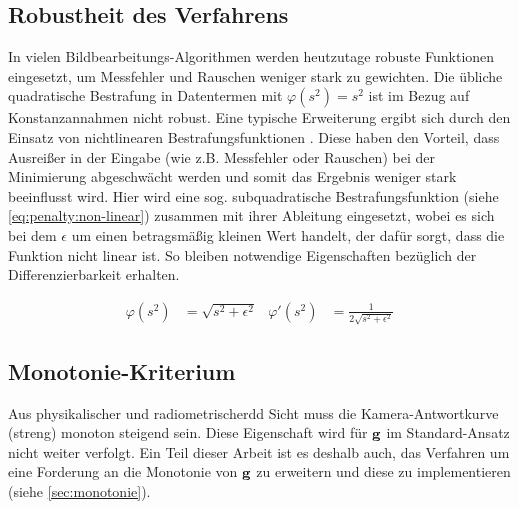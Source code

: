 \subsection{Robustheit des Verfahrens}
\label{algo:schwachstellen:robustheit}
In vielen Bildbearbeitungs-Algorithmen werden heutzutage robuste Funktionen eingesetzt, um Messfehler und Rauschen weniger stark zu gewichten. Die übliche quadratische Bestrafung in Datentermen mit $\varphi(s^2) = s^2$ ist im Bezug auf Konstanzannahmen nicht robust. Eine typische Erweiterung ergibt sich durch den Einsatz von nichtlinearen Bestrafungsfunktionen \cite[S. 9f, S. 87f]{bruhn06}. Diese haben den Vorteil, dass Ausreißer in der Eingabe (wie z.B. Messfehler oder Rauschen) bei der Minimierung abgeschwächt werden und somit das Ergebnis weniger stark beeinflusst wird. Hier wird eine sog. subquadratische Bestrafungsfunktion (siehe \autoref{eq:penalty:non-linear}) zusammen mit ihrer Ableitung eingesetzt, wobei es sich bei dem $\epsilon$ um einen betragsmäßig kleinen Wert handelt, der dafür sorgt, dass die Funktion nicht linear ist. So bleiben notwendige Eigenschaften bezüglich der Differenzierbarkeit erhalten.

\begin{align}
\label{eq:penalty:non-linear}
\varphi(s^2) &= \sqrt{s^2 + \epsilon^2} & 
\varphi'(s^2) &= \frac{1}{2\sqrt{s^2 + \epsilon^2}}
\end{align}

\subsection{Monotonie-Kriterium}
\label{algo:schwachstellen:monotonie}
Aus physikalischer und radiometrischerdd Sicht muss die Kamera-Antwortkurve (streng) monoton steigend sein. Diese Eigenschaft wird für $\mathbf g$ im Standard-Ansatz nicht weiter verfolgt. Ein Teil dieser Arbeit ist es deshalb auch, das Verfahren um eine Forderung an die Monotonie von $\mathbf g$ zu erweitern und diese zu implementieren (siehe \autoref{sec:monotonie}).
